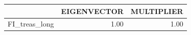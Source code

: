 \begin{tabular}{rrr}
  \hline
 & EIGENVECTOR & MULTIPLIER \\ 
  \hline
FI\_treas\_long & 1.00 & 1.00 \\ 
   \hline
\end{tabular}
